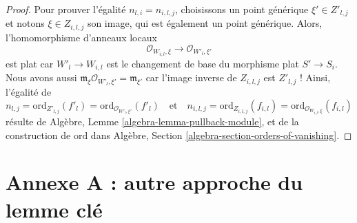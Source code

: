 \begin{proof}
\medskip\noindent
Pour prouver l'égalité $n_{l, i} = n_{i, l, j}$, choisissons un
point générique $\xi' \in Z'_{l, j}$ et notons
$\xi \in Z_{i, l, j}$ son image, qui est également un point générique.
Alors, l'homomorphisme d'anneaux locaux
$$
\mathcal{O}_{W_{i, l}, \xi}
\longrightarrow
\mathcal{O}_{W'_l, \xi'}
$$
est plat car $W'_l \to W_{i, l}$ est le changement de base du morphisme
plat $S' \to S_i$. Nous avons aussi
$\mathfrak m_\xi \mathcal{O}_{W'_l, \xi'} = \mathfrak m_{\xi'}$
car l'image inverse de $Z_{i, l, j}$ est $Z'_{l, j}$ ! Ainsi, l'égalité de
$$
n_{l, j} = \text{ord}_{Z'_{l, j}}(f'_l) =
\text{ord}_{\mathcal{O}_{W'_l, \xi'}}(f'_l)
\quad\text{et}\quad
n_{i, l, j} = \text{ord}_{Z_{i, l, j}}(f_{i, l}) =
\text{ord}_{\mathcal{O}_{W_{i, l}, \xi}}(f_{i, l})
$$
résulte de Algèbre, Lemme \ref{algebra-lemma-pullback-module},
et de la construction de $\text{ord}$ dans
Algèbre, Section \ref{algebra-section-orders-of-vanishing}.
\end{proof}












\section{Annexe A : autre approche du lemme clé}
\label{section-appendix-A}

